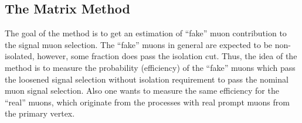 % 

\subsection{The Matrix Method}
\label{subsec:matrix_method}
The goal of the method is to get an estimation of ``fake'' muon contribution to the signal muon selection.
The ``fake'' muons in general are expected to be non-isolated, however, some fraction does pass the isolation cut. 
Thus, the idea of the method is to measure the probability (efficiency) of the ``fake'' muons
which pass the loosened signal selection without isolation requirement to pass the nominal muon signal selection.
Also one wants to measure the same efficiency for the ``real'' muons, which originate from the processes with real prompt muons from the primary vertex.

